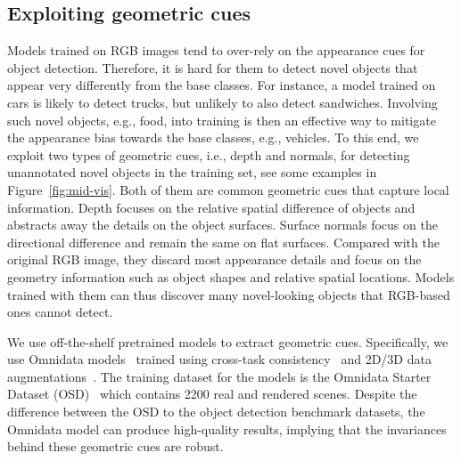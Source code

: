\documentclass{article} \usepackage{iclr2023_conference,times}
\begin{document}
\subsection{Exploiting geometric cues}
Models trained on RGB images tend to over-rely on the appearance cues for object detection. Therefore, it is hard for them to detect novel objects that appear very differently from the base classes. For instance, a model trained on cars is likely to detect trucks, but unlikely to also detect sandwiches. Involving such novel objects, e.g., food, into training is then an effective way to mitigate the appearance bias towards the base classes, e.g., vehicles. To this end, we exploit two types of geometric cues, i.e., depth and normals, for detecting unannotated novel objects in the training set, see some examples in Figure~\ref{fig:mid-vis}. Both of them are common geometric cues that capture local information. Depth focuses on the relative spatial difference of objects and abstracts away the details on the object surfaces. Surface normals focus on the directional difference and remain the same on flat surfaces. Compared with the original RGB image, they discard most appearance details and focus on the geometry information such as object shapes and relative spatial locations. Models trained with them can thus discover many novel-looking objects that RGB-based ones cannot detect.


We use off-the-shelf pretrained models to extract geometric cues. Specifically, we use Omnidata models~\citep{eftekhar2021omnidata} trained using cross-task consistency~\citep{zamir2020robust} and 2D/3D data augmentations~\citep{kar20223d}.
The training dataset for the models is the Omnidata Starter Dataset (OSD)~\citep{eftekhar2021omnidata} which contains 2200 real and rendered scenes. 
Despite the difference between the OSD to the object detection benchmark datasets, the Omnidata model can produce high-quality results, implying that the invariances behind these geometric cues are robust. 
\end{document}
